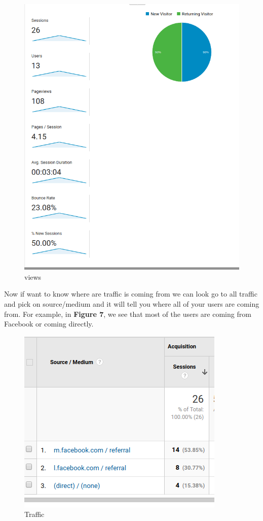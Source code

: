 \documentclass{article}
\begin{document}
\begin{figure}[h!]
\includegraphics[scale = .5]{newuser.png}
\centering
\caption{views}
\end{figure}

Now if want to know where are traffic is coming from we can look go to all traffic and pick on source/medium and it will tell you where all of your users are coming from. For example, in \textbf{Figure 7}, we see that most of the users are coming from Facebook or coming directly.

\begin{figure}[h!]
\includegraphics[scale = .5]{traffic.png}
\centering
\caption{Traffic}
\end{figure}
\end{document}
